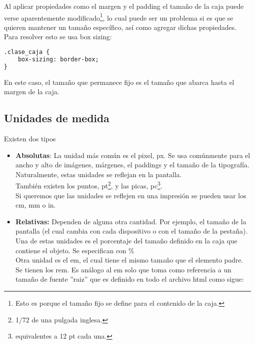 \documentclass[10pt,oneside]{article}
\begin{document}
\begin{multicols}{2}
    Al aplicar propiedades como el margen y el padding el tamaño de la caja puede verse aparentemente modificado\footnote{Esto es porque el tamaño fijo se define para el contenido de la caja.}, lo cual puede ser un problema si es que se quieren mantener un tamaño específico, así como agregar dichas propiedades. Para resolver esto se usa box sizing:

    \begin{lstlisting}[language=HTML]
.clase_caja {
    box-sizing: border-box;
}
    \end{lstlisting}

    En este caso, el tamaño que permanece fijo es el tamaño que abarca hasta el margen de la caja.

\subsection{Unidades de medida}

    Existen dos tipos 
    
    \begin{itemize}
        \item \textbf{Absolutas}: La unidad más común es el pixel, px. Se usa comúnmente para el ancho y alto de imágenes, márgenes, el paddings y el tamaño de la tipografía. Naturalmente, estas unidades se reflejan en la pantalla.\\ \newline También existen los puntos, pt\footnote{1/72 de una pulgada inglesa.}, y las picas, pc\footnote{equivalentes a 12 pt cada una.}. \\ \newline Si queremos que las unidades se reflejen en una impresión se pueden usar los cm, mm o in.
        \item \textbf{Relativas:} Dependen de alguna otra cantidad. Por ejemplo, el tamaño de la pantalla (el cual cambia con cada dispositivo o con el tamaño de la pestaña).\\ \newline Una de estas unidades es el porcentaje del tamaño definido en la caja que contiene el objeto. Se especifican con \%\\ \newline Otra unidad es el em, el cual tiene el mismo tamaño que el elemento padre. \\ \newline Se tienen los rem. Es análogo al em solo que toma como referencia a un tamaño de fuente ''raiz'' que es definido en todo el archivo html como sigue:


\end{itemize}
\end{multicols}
\end{document}
